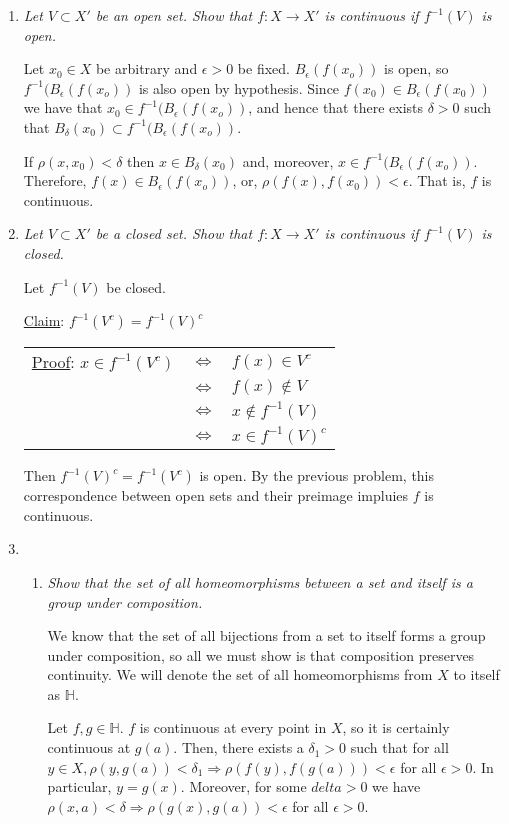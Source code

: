 \documentclass[12pt]{article}
\begin{document}
\begin{enumerate}
\item \emph{Let $V \subset X'$ be an open set.  Show that $f: X \rightarrow X'$ is continuous if $f^{-1}(V)$ is open.}

Let $x_0 \in X$ be arbitrary and $\epsilon > 0$ be fixed.  $B_\epsilon(f(x_o))$ is open, so $f^{-1}(B_\epsilon(f(x_o))$ is also open by hypothesis.  Since $f(x_0) \in B_\epsilon(f(x_0))$ we have that $x_0 \in f^{-1}(B_\epsilon(f(x_o))$, and hence that there exists $\delta > 0$ such that $B_\delta(x_0) \subset f^{-1}(B_\epsilon(f(x_o))$.

If $\rho(x,x_0) < \delta$ then $x \in B_\delta(x_0)$ and, moreover, $x \in f^{-1}(B_\epsilon(f(x_o))$.  Therefore, $f(x) \in B_\epsilon(f(x_o))$, or, $\rho(f(x),f(x_0)) < \epsilon$.  That is, $f$ is continuous.
\item \emph{Let $V \subset X'$ be a closed set.  Show that $f: X \rightarrow X'$ is continuous if $f^{-1}(V)$ is closed.}

Let $f^{-1}(V)$ be closed.  

\underline{Claim}: $f^{-1}(V^c) = f^{-1}(V)^c$

\begin{tabular}{lll}
\underline{Proof}:	$x \in f^{-1}(V^c)$ 	& $\Leftrightarrow$ & $f(x) \in V^c$\\
						& $\Leftrightarrow$ & $f(x) \notin V$\\
						& $\Leftrightarrow$ & $x \notin f^{-1}(V)$\\
						& $\Leftrightarrow$ & $x \in f^{-1}(V)^c$
\end{tabular}

Then $f^{-1}(V)^c = f^{-1}(V^c)$ is open.  By the previous problem, this correspondence between open sets and their preimage impluies $f$ is continuous.

\item
\begin{enumerate}
\item \emph{Show that the set of all homeomorphisms between a set and itself is a group under composition.}

We know that the set of all bijections from a set to itself forms a group under composition, so all we must show is that composition preserves continuity.  We will denote the set of all homeomorphisms from $X$ to itself as $\mathbb{H}$.

Let $f,g \in \mathbb{H}$.  $f$ is continuous at every point in $X$, so it is certainly continuous at $g(a)$.  Then, there exists a $\delta_1>0$ such that for all $y \in X,\rho(y,g(a))<\delta_1 \Rightarrow \rho(f(y),f(g(a)))<\epsilon$ for all $\epsilon>0$.  In particular, $y=g(x)$.  Moreover, for some $delta>0$ we have $\rho(x,a)<\delta \Rightarrow \rho(g(x),g(a))<\epsilon$ for all $\epsilon>0$.  


\end{enumerate}
\end{enumerate}
\end{document}
